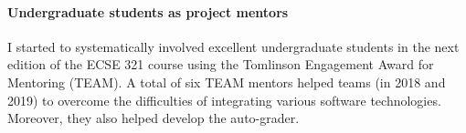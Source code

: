 


\paragraph{Undergraduate students as project mentors}
I started to systematically involved excellent undergraduate students in the next edition of the ECSE 321 course using the Tomlinson Engagement Award for Mentoring (TEAM). A total of six TEAM mentors helped teams (in 2018 and 2019) to overcome the difficulties of integrating various software technologies. Moreover, they also helped develop the auto-grader.  %

